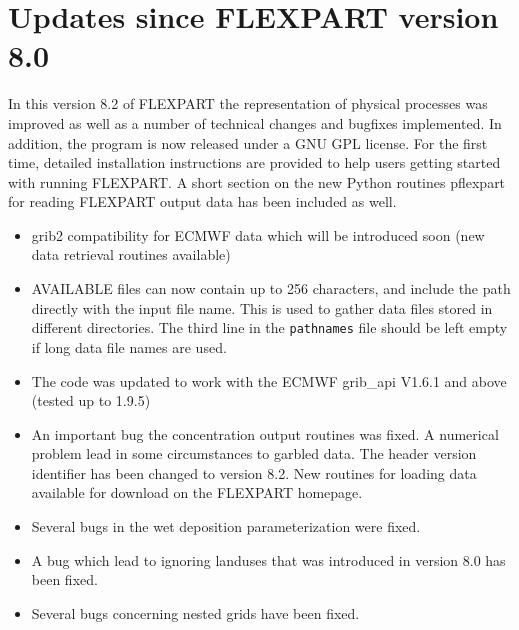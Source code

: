 \documentclass{egu}            %
\begin{document}
\section{Updates since FLEXPART version 8.0} 

In this version 8.2 of FLEXPART the representation of physical processes was
improved as well as a number of technical changes and bugfixes implemented.  In
addition, the program is now released under a GNU GPL license.  For the first
time, detailed installation instructions are provided to help users getting
started with running FLEXPART.  A short section on the new Python routines
pflexpart for reading FLEXPART output data has been included as well.
\bigskip


\begin{itemize} 

\item grib2 compatibility for ECMWF data which will be introduced soon (new
data retrieval routines available)

\item AVAILABLE files can now contain up to 256 characters, and include the
path directly with the input file name.  This is used to gather data files
stored in different directories.  The third line in the \verb|pathnames| file
should be left empty if long data file names are used.

\item The code was updated to work with the ECMWF grib\_api V1.6.1 and above
(tested up to 1.9.5)

\item An important bug the concentration output routines was fixed.  A
numerical problem lead in some circumstances to garbled data.  The header
version identifier has been changed to version 8.2.  New routines for loading
data available for download on the FLEXPART homepage.

\item Several bugs in the wet deposition parameterization were fixed.

\item A bug which lead to ignoring landuses that was introduced in version 8.0
has been fixed.

\item Several bugs concerning nested grids have been fixed.

\end{itemize}

\end{document}
